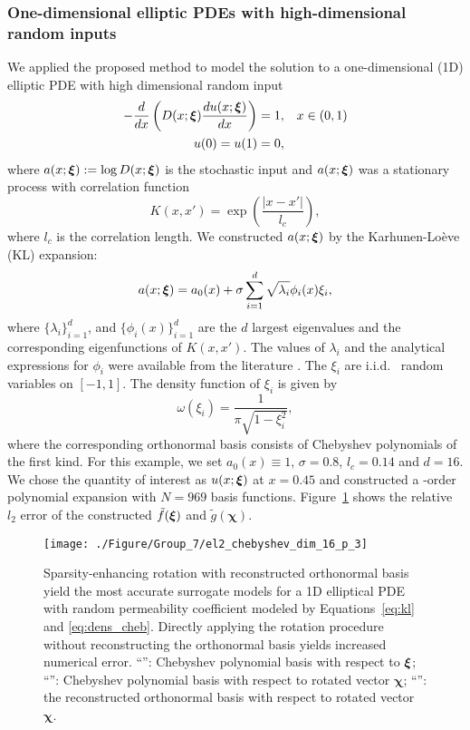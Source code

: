 \subsubsection{One-dimensional elliptic \acp{PDE} with high-dimensional random inputs}
We applied the proposed method to model the solution to a one-dimensional (1D) elliptic \ac{PDE} with high dimensional random input
\begin{equation}
  \begin{aligned}
    -\frac{d}{dx} \left( D(x;\bm\xi)\frac{d u(x;\bm\xi)}{dx} \right) = 1, & \quad x \in (0,1) \\
    u(0) = u(1) = 0, &
  \end{aligned} \label{eq:ellip}
\end{equation}
where $a(x;\bm\xi) := \log D(x;\bm\xi)$ is the stochastic input and $a(x;\bm\xi)$ was a stationary process with correlation function 
\begin{equation} \label{eq:exp_kernel}
  K(x,x') = \exp\left(\dfrac{|x-x'|}{l_c}\right),
\end{equation}
where $l_c$ is the correlation length.
We constructed $a(x;\bm\xi)$ by the Karhunen-Lo\`eve (KL) expansion:
\begin{equation} \label{eq:kl}
  a(x;\bm\xi) = a_0(x) + \sigma \sum_{i=1}^{d}\sqrt{\lambda_i}\phi_i(x)\xi_i, 
\end{equation}
where $\{\lambda_i\}_{i=1}^{d}$, and $\{\phi_i(x)\}_{i=1}^{d}$ are the $d$ largest eigenvalues and the corresponding eigenfunctions of $K(x,x')$.
The values of $\lambda_i$ and the analytical expressions for $\phi_i$ were available from the literature \cite{JardakSK02}.
The $\xi_i$ are i.i.d.~ random variables on $\left[-1, 1\right]$. The 
density function of $\xi_i$ is given by
\begin{equation}
\omega(\xi_i) = \frac{1}{\pi \sqrt{1 - \xi_i^2}},
\label{eq:dens_cheb}
\end{equation}
where the corresponding orthonormal basis consists of Chebyshev polynomials of 
the first kind. 
For this example, we set $a_0(x) \equiv 1$, $\sigma = 0.8$, $l_c = 0.14$ and $d = 16$.
We chose the quantity of interest as $u(x;\bm\xi)$ at $x=0.45$ and constructed a -order polynomial expansion with $N=969$ basis functions.
Figure~\ref{fig:l2_chebyshev} shows the relative $l_2$ error of the constructed $\tilde{f}(\bm\xi)$ and $\tilde{g}({\bm\chi})$.
\begin{figure}[tbp]
  \center
  \texttt{[image: ./Figure/Group\_7/el2\_chebyshev\_dim\_16\_p\_3]}
  \caption{Sparsity-enhancing rotation with reconstructed orthonormal basis yield the most accurate surrogate 
    models for a 1D elliptical \ac{PDE} with random permeability coefficient modeled by Equations~\eqref{eq:kl} and \eqref{eq:dens_cheb}.
  Directly applying the rotation procedure without reconstructing the orthonormal basis yields increased numerical error. 
  ``\textcolor{red}{\protect\rectanglesolidline}'':  Chebyshev polynomial basis with respect to $\bm\xi$;  
  ``\textcolor{red}{\protect\triangledashdotline}'':  Chebyshev  polynomial basis with respect to rotated vector $\bm\chi$;  
  ``\textcolor{blue}{\protect\downtriangledashline}'':  the reconstructed orthonormal  basis with respect to rotated vector $\bm\chi$.
  } \label{fig:l2_chebyshev}
\end{figure}
